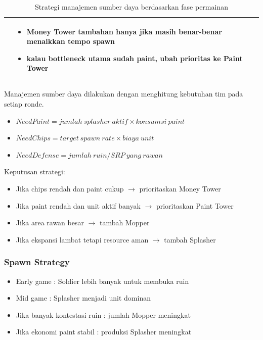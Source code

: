\documentclass{article}
\begin{document}
\begin{table}[H]
\begin{tabular}{|p{}|p{}|p{}|}
&

\begin{itemize}[leftmargin=*, nosep]
\item Money Tower tambahan hanya jika masih benar-benar menaikkan tempo spawn
\item kalau bottleneck utama sudah paint, ubah prioritas ke Paint Tower
\end{itemize}

\\
\hline

\end{tabular}
\caption{Strategi manajemen sumber daya berdasarkan fase permainan}
\end{table}

Manajemen sumber daya dilakukan dengan menghitung kebutuhan tim pada setiap ronde.

\begin{itemize}
\item $NeedPaint = jumlah\ splasher\ aktif \times konsumsi\ paint$
\item $NeedChips = target\ spawn\ rate \times biaya\ unit$
\item $NeedDefense = jumlah\ ruin/SRP\ yang\ rawan$
\end{itemize}

Keputusan strategi:

\begin{itemize}
\item Jika chips rendah dan paint cukup \(\rightarrow\) prioritaskan Money Tower
\item Jika paint rendah dan unit aktif banyak \(\rightarrow\) prioritaskan Paint Tower
\item Jika area rawan besar \(\rightarrow\) tambah Mopper
\item Jika ekspansi lambat tetapi resource aman \(\rightarrow\) tambah Splasher
\end{itemize}

\subsubsection{Spawn Strategy}

\begin{itemize}
\item Early game : Soldier lebih banyak untuk membuka ruin
\item Mid game : Splasher menjadi unit dominan
\item Jika banyak kontestasi ruin : jumlah Mopper meningkat
\item Jika ekonomi paint stabil : produksi Splasher meningkat
\end{itemize}
\end{document}
